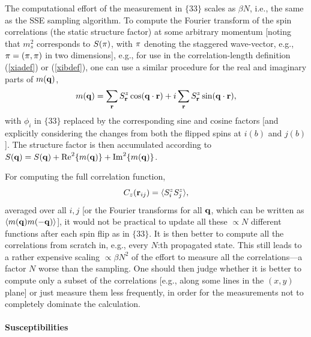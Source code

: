 \documentclass[draft,numberedheadings]{aipproc}
\begin{document}
The computational effort of the measurement in $\{33\}$ scales as $\beta N$, i.e., the same as the SSE sampling algorithm.  To compute the Fourier transform 
of the spin correlations (the static structure factor) at some arbitrary momentum [noting that $m_s^2$ corresponds to $S({\bf \pi})$, with ${\bf \pi}$ denoting
the staggered wave-vector, e.g., ${\bf \pi}=(\pi,\pi)$ in two dimensions], e.g., for use in the correlation-length definition (\ref{xiadef}) or (\ref{xibdef}), 
one can use a similar procedure for the real and imaginary parts of $m({\bf q})$,
\begin{equation}
m({\bf q}) = \sum_{\bf r}S^z_{\bf r}\cos({\bf q}\cdot {\bf r}) + i\sum_{\bf r}S^z_{\bf r}\sin({\bf q}\cdot {\bf r}),
\label{magqdef}
\end{equation}
with $\phi_i$ in $\{33\}$ replaced by the corresponding sine and cosine factors [and explicitly considering the changes from both the flipped spins 
at $i(b)$ and $j(b)$]. The structure factor is then accumulated according to $S({\bf q})=S({\bf q})+{\rm Re}^2\{m({\bf q})\}+{\rm Im}^2\{m({\bf q})\}$.
 
For computing the full correlation function,
\begin{equation}
C_z({\bf r}_{ij})=\langle S^z_iS^z_j\rangle,
\label{czrheis}
\end{equation}
averaged over all $i,j$ [or the Fourier transforms for all ${\bf q}$, which can be written as $\langle m({\bf q})m({\bf -q})\rangle$], it would not be 
practical to update all these $\propto N$ different functions after each spin flip as in $\{33\}$. It is then better to compute all the correlations from 
scratch in, e.g., every $N$:th propagated state. This still leads to a rather expensive scaling $\propto \beta N^2$ of the effort to measure all the 
correlations---a factor $N$ worse than the sampling. One should then judge whether it is better to compute only a subset of the correlations [e.g., along 
some lines in the $(x,y)$ plane] or just measure them less frequently, in order for the measurements not to completely dominate the calculation.

\paragraph{Susceptibilities}
\end{document}
